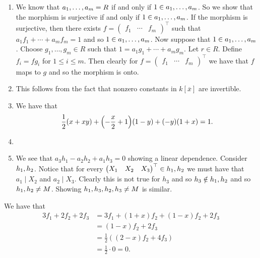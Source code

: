 \documentclass[letterpaper, 11pt, oneside]{book}
\begin{document}
\clearpage

\begin{sol}\label{ex:UAG_5.1.10}
  \begin{enumerate}
    \item We know that $\gen{a_{1}, \ldots, a_{m}} = R$ if and only if $1 \in \gen{a_{1}, \ldots, a_{m}}$.
          So we show that the morphism is surjective if and only if $1 \in \gen{a_{1}, \ldots, a_{m}}$.
          If the morphism is surjective, then there exists $f = \begin{pmatrix} f_{1} & \cdots & f_{m} \end{pmatrix}^{\top}$ such that $a_{1}f_{1} + \cdots + a_{m}f_{m} = 1$ and so $1 \in \gen{a_{1}, \ldots, a_{m}}$.
          Now suppose that $1 \in \gen{a_{1}, \ldots, a_{m}}$.
          Choose $g_{1}, \ldots, g_{m} \in R$ such that $1 = a_{1}g_{1} + \cdots + a_{m}g_{m}$.
          Let $r \in R$.
          Define $f_{i} = f g_{i}$ for $1 \leq i \leq m$.
          Then clearly for $f = \begin{pmatrix} f_{1} & \cdots & f_{m} \end{pmatrix}^{\top}$ we have that $f$ maps to $g$ and so the morphism is onto.
    \item This follows from the fact that nonzero constants in $k[\overline{x}]$ are invertible.
    \item We have that
          \[
            \frac{1}{2}(x + xy) + \pqty{-\frac{x}{2} + 1}(1 - y) + (-y)(1 + x) = 1.
          \]
    \item {}
    \item We see that $a_{3} h_{1} - a_{2} h_{2} + a_{1} h_{3} = 0$ showing a linear dependence.
          Consider $\gen{h_{1}, h_{2}}$.
          Notice that for every $\begin{pmatrix} X_{1} & X_{2} & X_{3} \end{pmatrix}^{\top} \in \gen{h_{1}, h_{2}}$ we must have that $a_{1} \mid X_{2}$ and $a_{2} \mid X_{3}$.
          Clearly this is not true for $h_{3}$ and so $h_{3} \notin \gen{h_{1}, h_{2}}$ and so $\gen{h_{1}, h_{2}} \neq M$.
          Showing $\gen{h_{1}, h_{3}}, \gen{h_{2}, h_{3}} \neq M$ is similar.
  \end{enumerate}
\end{sol}

\begin{sol}\label{ex:UAG_5.1.11}
  We have that
  \begin{align*}
    3f_{1} + 2f_{2} + 2f_{3} &= 3f_{1} + (1 + x)f_{2} + (1 - x)f_{2} + 2f_{3} \\
                             &= (1 - x)f_{2} + 2f_{3} \\
                             &= \frac{1}{2}((2 - x)f_{2} + 4f_{3}) \\
                             &= \frac{1}{2} \cdot 0 = 0.
  \end{align*}
\end{sol}
\end{document}
